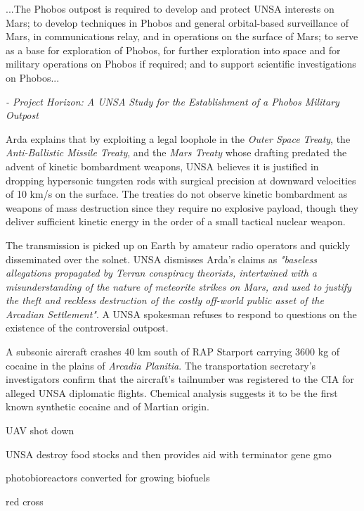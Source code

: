 \startTimelineGeneralDocument
...The Phobos outpost is required to develop and protect UNSA interests on Mars; to develop techniques in Phobos and general orbital-based surveillance of Mars, in communications relay, and in operations on the surface of Mars; to serve as a base for exploration of Phobos, for further exploration into space and for military operations on Phobos if required; and to support scientific investigations on Phobos...

\hskip 1.5cm {\it - Project Horizon: A UNSA Study for the Establishment of a Phobos Military Outpost}
\stopTimelineGeneralDocument

Arda explains that by exploiting a legal loophole in the {\it Outer Space Treaty}, the {\it Anti-Ballistic Missile Treaty}, and the {\it Mars Treaty} whose drafting predated the advent of kinetic bombardment weapons, UNSA believes it is justified in dropping hypersonic tungsten rods with surgical precision at downward velocities of 10 km/s on the surface. The treaties do not observe kinetic bombardment as weapons of mass destruction since they require no explosive payload, though they deliver sufficient kinetic energy in the order of a small tactical nuclear weapon.

The transmission is picked up on Earth by amateur radio operators and quickly disseminated over the solnet. UNSA dismisses Arda's claims as {\it "baseless allegations propagated by Terran conspiracy theorists, intertwined with a misunderstanding of the nature of meteorite strikes on Mars, and used to justify the theft and reckless destruction of the costly off-world public asset of the Arcadian Settlement"}. A UNSA spokesman refuses to respond to questions on the existence of the controversial outpost.
\StopTimelineDate

A subsonic aircraft crashes 40 km south of RAP Starport carrying 3600 kg of cocaine in the plains of {\it Arcadia Planitia}. The transportation secretary's investigators confirm that the aircraft's tailnumber was registered to the CIA for alleged UNSA diplomatic flights. Chemical analysis suggests it to be the first known synthetic cocaine and of Martian origin.
\StopTimelineDate

UAV shot down

UNSA destroy food stocks and then provides aid with terminator gene gmo

photobioreactors converted for growing biofuels

red cross

